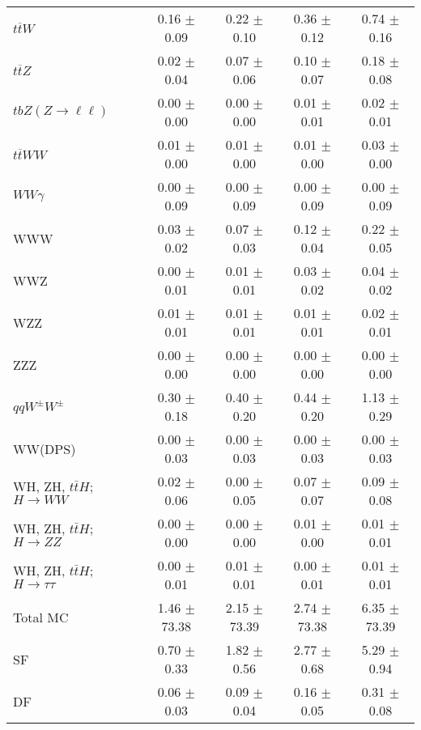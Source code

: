 \begin{tabular}{l|cccc}
                   $t\overline{t}W$ &  0.16 $\pm$  0.09 &  0.22 $\pm$  0.10 &  0.36 $\pm$  0.12 &  0.74 $\pm$  0.16 \\
                   $t\overline{t}Z$ &  0.02 $\pm$  0.04 &  0.07 $\pm$  0.06 &  0.10 $\pm$  0.07 &  0.18 $\pm$  0.08 \\
    $tbZ (Z \rightarrow \ell \ell)$ &  0.00 $\pm$  0.00 &  0.00 $\pm$  0.00 &  0.01 $\pm$  0.01 &  0.02 $\pm$  0.01 \\
                  $t\overline{t}WW$ &  0.01 $\pm$  0.00 &  0.01 $\pm$  0.00 &  0.01 $\pm$  0.00 &  0.03 $\pm$  0.00 \\
                         $WW\gamma$ &  0.00 $\pm$  0.09 &  0.00 $\pm$  0.09 &  0.00 $\pm$  0.09 &  0.00 $\pm$  0.09 \\
                                WWW &  0.03 $\pm$  0.02 &  0.07 $\pm$  0.03 &  0.12 $\pm$  0.04 &  0.22 $\pm$  0.05 \\
                                WWZ &  0.00 $\pm$  0.01 &  0.01 $\pm$  0.01 &  0.03 $\pm$  0.02 &  0.04 $\pm$  0.02 \\
                                WZZ &  0.01 $\pm$  0.01 &  0.01 $\pm$  0.01 &  0.01 $\pm$  0.01 &  0.02 $\pm$  0.01 \\
                                ZZZ &  0.00 $\pm$  0.00 &  0.00 $\pm$  0.00 &  0.00 $\pm$  0.00 &  0.00 $\pm$  0.00 \\
                 $qqW^{\pm}W^{\pm}$ &  0.30 $\pm$  0.18 &  0.40 $\pm$  0.20 &  0.44 $\pm$  0.20 &  1.13 $\pm$  0.29 \\
                            WW(DPS) &  0.00 $\pm$  0.03 &  0.00 $\pm$  0.03 &  0.00 $\pm$  0.03 &  0.00 $\pm$  0.03 \\
WH, ZH, $t\bar{t}H$; $H \rightarrow WW$ &  0.02 $\pm$  0.06 &  0.00 $\pm$  0.05 &  0.07 $\pm$  0.07 &  0.09 $\pm$  0.08 \\
WH, ZH, $t\bar{t}H$; $H \rightarrow ZZ$ &  0.00 $\pm$  0.00 &  0.00 $\pm$  0.00 &  0.01 $\pm$  0.00 &  0.01 $\pm$  0.01 \\
WH, ZH, $t\bar{t}H$; $H \rightarrow \tau\tau$ &  0.00 $\pm$  0.01 &  0.01 $\pm$  0.01 &  0.00 $\pm$  0.01 &  0.01 $\pm$  0.01 \\
\hline\hline
                           Total MC &  1.46 $\pm$ 73.38 &  2.15 $\pm$ 73.39 &  2.74 $\pm$ 73.38 &  6.35 $\pm$ 73.39 \\
\hline
                                 SF &  0.70 $\pm$  0.33 &  1.82 $\pm$  0.56 &  2.77 $\pm$  0.68 &  5.29 $\pm$  0.94 \\
                                 DF &  0.06 $\pm$  0.03 &  0.09 $\pm$  0.04 &  0.16 $\pm$  0.05 &  0.31 $\pm$  0.08 \\

\end{tabular}
